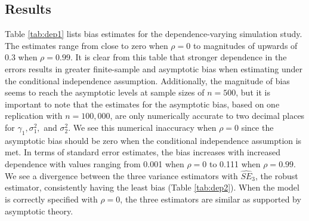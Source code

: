 \subsection{Results}
Table \ref{tab:dep1} lists bias estimates for the dependence-varying simulation study. The estimates range from close to zero when $\rho=0$ to magnitudes of upwards of 0.3 when $\rho = 0.99$. It is clear from this table that stronger dependence in the errors results in greater finite-sample and asymptotic bias when estimating under the conditional independence assumption. Additionally, the magnitude of bias seems to reach the asymptotic levels at sample sizes of $n=500$, but it is important to note that the estimates for the asymptotic bias, based on one replication with $n=100,000$, are only numerically accurate to two decimal places for $\gamma_{1},\sigma^{2}_{1},$ and $\sigma^{2}_{2}$. We see this numerical inaccuracy when $\rho=0$ since the asymptotic bias should be zero when the conditional independence assumption is met.  In terms of standard error estimates, the bias increases with increased dependence with values ranging from 0.001 when $\rho=0$ to 0.111 when $\rho = 0.99$. We see a divergence between the three variance estimators with $\widehat{SE}_3$, the robust estimator, consistently having the least bias (Table \ref{tab:dep2}).  When the model is correctly specified with $\rho=0$, the three estimators are similar as supported by asymptotic theory.  

